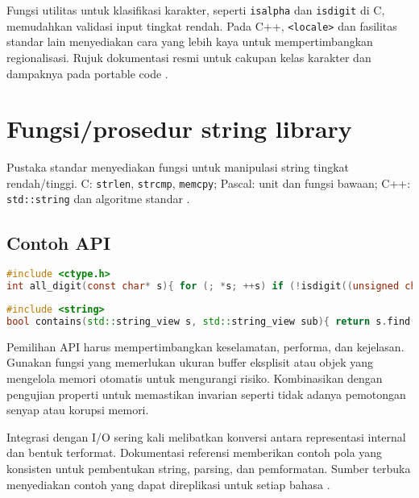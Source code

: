 \documentclass[../main.tex]{subfiles}
\begin{document}
Fungsi utilitas untuk klasifikasi karakter, seperti \texttt{isalpha} dan \texttt{isdigit} di C, memudahkan validasi input tingkat rendah. Pada C++, \texttt{<locale>} dan fasilitas standar lain menyediakan cara yang lebih kaya untuk mempertimbangkan regionalisasi. Rujuk dokumentasi resmi untuk cakupan kelas karakter dan dampaknya pada portable code \parencite{iso-c-draft-n1570,cpp-reference}.

\section{Fungsi/prosedur string library}
Pustaka standar menyediakan fungsi untuk manipulasi string tingkat rendah/tinggi. C: \texttt{strlen}, \texttt{strcmp}, \texttt{memcpy}; Pascal: unit dan fungsi bawaan; C++: \texttt{std::string} dan algoritme standar \parencite{c-strings-h,free-pascal-docs,cpp-strings}.

\subsection{Contoh API}
\begin{lstlisting}[language=C, caption={Validasi digit dengan <ctype.h>}]
#include <ctype.h>
int all_digit(const char* s){ for (; *s; ++s) if (!isdigit((unsigned char)*s)) return 0; return 1; }
\end{lstlisting}

\begin{lstlisting}[language=C++, caption={Mencari substring di C++}]
#include <string>
bool contains(std::string_view s, std::string_view sub){ return s.find(sub) != std::string::npos; }
\end{lstlisting}

Pemilihan API harus mempertimbangkan keselamatan, performa, dan kejelasan. Gunakan fungsi yang memerlukan ukuran buffer eksplisit atau objek yang mengelola memori otomatis untuk mengurangi risiko. Kombinasikan dengan pengujian properti untuk memastikan invarian seperti tidak adanya pemotongan senyap atau korupsi memori.

Integrasi dengan I/O sering kali melibatkan konversi antara representasi internal dan bentuk terformat. Dokumentasi referensi memberikan contoh pola yang konsisten untuk pembentukan string, parsing, dan pemformatan. Sumber terbuka menyediakan contoh yang dapat direplikasi untuk setiap bahasa \parencite{c-strings-h,cpp-strings,free-pascal-docs}.
\end{document}
